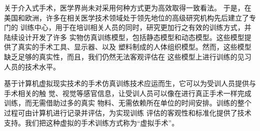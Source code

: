 关于介入式手术，医学界尚未对采用何种方式更为高效取得一致看法\cite{basdogan2007}。
于是，在美国和欧洲，许多在相关医学技术领域处于领先地位的高级研究机构先后建立了专门的
训练中心，用于在培训相关人员的同时，研究更加行之有效的训练方式，并陆续设计开发了许多
实物仿真训练模型，包括静态模型和动态模型\cite{Cooper2004Review}。这些模型提供了真实的手术工具、显示器、以及
塑料制成的人体组织模型。然而，这些模型缺乏足够的真实性，而且，我们仍然无法客观评估在
这些模型上进行训练的见习人员的技术水平。

基于计算机虚拟现实技术的手术仿真训练技术应运而生，它可以为受训人员提供与手术相关的触
觉、视觉等感官信息，让受训人员可以像在进行真正手术一样完成训练，而无需借助过多的真实
物料、无需依赖所在单位的时间安排。训练的整个过程可由计算机进行记录并评估，为实现训练
评估的客观性和标准化提供了技术支持。我们把这种虚拟的手术训练方式称为“虚拟手术”。


